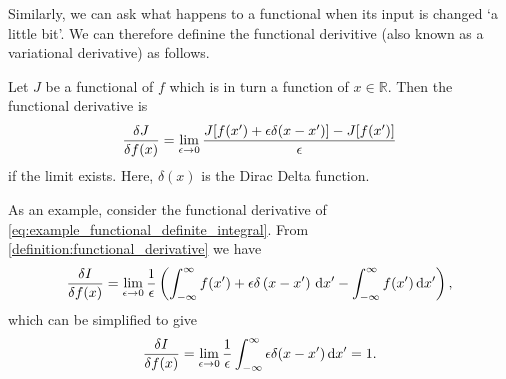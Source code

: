 Similarly, we can ask what happens to a functional when its input is changed `a little bit'. We can therefore
definine the functional derivitive (also known as a variational derivative) as follows.
\begin{definition}
  \label{definition:functional_derivative}
  Let $J$ be a functional of $f$ which is in turn a function of $x \in \mathbb{R}$. Then the functional derivative is
  \begin{equation}
    \label{eq:definition_of_functional_derivative}
    \fdv{J}{f(x)} = \lim_{\epsilon\rightarrow 0} \frac{J[f(x') + \epsilon \delta(x - x')] - J[f(x')]}{\epsilon}
  \end{equation}
  if the limit exists. Here, $\delta(x)$ is the Dirac Delta function.
\end{definition}

As an example, consider the functional derivative of \cref{eq:example_functional_definite_integral}. From \cref{definition:functional_derivative}
we have
\begin{equation*}
  \fdv{I}{f(x)} = \lim_{\epsilon\rightarrow 0} \frac{1}{\epsilon} \left(\int_{-\infty}^{\infty} f(x') + \epsilon \delta\left(x-x'\right)\,\mathrm{d}x' 
      - \int_{-\infty}^{\infty} f(x')\,\mathrm{d}x'\right),
\end{equation*}
which can be simplified to give
\begin{equation*}
  \fdv{I}{f(x)} = \lim_{\epsilon\rightarrow 0}\frac{1}{\epsilon}\int_{-\infty}^{\infty} \epsilon \delta(x-x')\,\mathrm{d}x' = 1.
\end{equation*}

